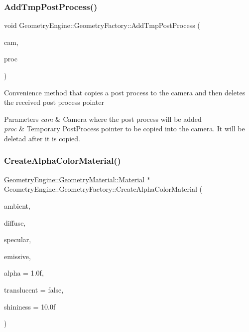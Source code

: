 \subsubsection{\texorpdfstring{AddTmpPostProcess()}{AddTmpPostProcess()}}
{\footnotesize\ttfamily void Geometry\+Engine\+::\+Geometry\+Factory\+::\+Add\+Tmp\+Post\+Process (\begin{DoxyParamCaption}\item[{\mbox{\hyperlink{class_geometry_engine_1_1_geometry_world_item_1_1_geometry_camera_1_1_camera}{Geometry\+World\+Item\+::\+Geometry\+Camera\+::\+Camera}} \&}]{cam,  }\item[{\mbox{\hyperlink{class_geometry_engine_1_1_geometry_post_process_1_1_post_process}{Geometry\+Post\+Process\+::\+Post\+Process}} $\ast$}]{proc }\end{DoxyParamCaption})\hspace{0.3cm}{\ttfamily [static]}}

Convenience method that copies a post process to the camera and then deletes the received post process pointer 
\begin{DoxyParams}{Parameters}
{\em cam} & Camera where the post process will be added \\
\hline
{\em proc} & Temporary Post\+Process pointer to be copied into the camera. It will be deletad after it is copied. \\
\hline
\end{DoxyParams}
\mbox{\label{class_geometry_engine_1_1_geometry_factory_a3d37605b9cc44fd0b3a058f961b76a35}} 
\subsubsection{\texorpdfstring{CreateAlphaColorMaterial()}{CreateAlphaColorMaterial()}}
{\footnotesize\ttfamily \mbox{\hyperlink{class_geometry_engine_1_1_geometry_material_1_1_material}{Geometry\+Engine\+::\+Geometry\+Material\+::\+Material}} $\ast$ Geometry\+Engine\+::\+Geometry\+Factory\+::\+Create\+Alpha\+Color\+Material (\begin{DoxyParamCaption}\item[{const Q\+Vector3D \&}]{ambient,  }\item[{const Q\+Vector3D \&}]{diffuse,  }\item[{const Q\+Vector3D \&}]{specular,  }\item[{const Q\+Vector3D \&}]{emissive,  }\item[{float}]{alpha = {\ttfamily 1.0f},  }\item[{bool}]{translucent = {\ttfamily false},  }\item[{float}]{shininess = {\ttfamily 10.0f} }\end{DoxyParamCaption})\hspace{0.3cm}{\ttfamily [static]}}

